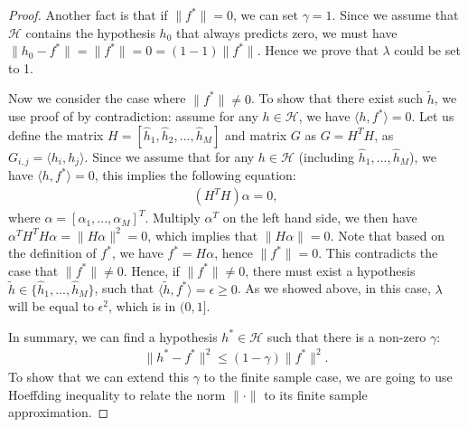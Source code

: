 \begin{proof}
Another fact is that if $\|f^*\| = 0$, we can set $\gamma = 1$. Since we assume that $\mathcal{H}$ contains the hypothesis $h_0$ that always predicts zero, we must have $\|h_0 - f^*\| = \|f^*\| = 0 = (1-1)\|f^*\|$. Hence we prove that $\lambda$ could be set to 1. 

Now we consider the case where $\|f^*\|\neq 0$. To show that there exist such $\tilde{h}$, we use proof of by contradiction: assume for any $h\in\mathcal{H}$, we have $\langle h, f^* \rangle = 0$. Let us define the matrix $H = [\hat{h}_1, \hat{h}_2, ..., \hat{h}_M]$ and matrix $G$ as $G = H^T H$, as $G_{i,j} = \langle h_i, h_j\rangle$. Since we assume that for any $h\in\mathcal{H}$ (including $\hat{h}_1, ..., \hat{h}_M$), we have $\langle h,f^* \rangle = 0$, this implies the following equation:
\begin{align}
(H^T H)\alpha = 0,
\end{align} where $\alpha = [\alpha_1,...,\alpha_M]^T$. Multiply $\alpha^T$ on the left hand side, we then have $\alpha^T H^T H \alpha = \| H\alpha \|^2 = 0$, which implies that $\|H\alpha\| = 0$. Note that based on the definition of $f^*$, we have $f^* = H\alpha$, hence $\|f^*\| = 0$. This contradicts the case that $\|f^*\|\neq 0$. Hence, if $\|f^*\|\neq 0$, there must exist a hypothesis $\tilde{h}\in\{\hat{h}_1,...,\hat{h}_M\}$, such that $\langle \tilde{h}, f^*\rangle = \epsilon \geq 0$. As we showed above, in this case, $\lambda$ will be equal to $\epsilon^2$, which is in $(0,1]$. 

In summary, we can find a hypothesis $h^*\in\mathcal{H}$ such that there is a non-zero $\gamma$:
\begin{align}
\|h^* - f^*\|^2 \leq (1-\gamma)\|f^*\|^2.
\end{align}
To show that we can extend this $\gamma$ to the finite sample case, we are going to use Hoeffding inequality to relate the norm $\|\cdot\|$ to its finite sample approximation. 


\end{proof}
